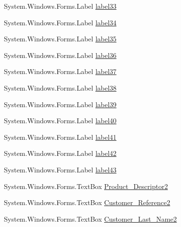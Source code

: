 \begin{DoxyCompactItemize}
\item 
System.\+Windows.\+Forms.\+Label \mbox{\hyperlink{class_cert_complete_1_1_test___creation___form_a7800633a4130b258f169fe7e93ec4bdb}{label33}}
\item 
System.\+Windows.\+Forms.\+Label \mbox{\hyperlink{class_cert_complete_1_1_test___creation___form_a40d4c70b3f1bcb0edff593cf84428ccf}{label34}}
\item 
System.\+Windows.\+Forms.\+Label \mbox{\hyperlink{class_cert_complete_1_1_test___creation___form_a8e039eaadc55719485b3562382d0e7e3}{label35}}
\item 
System.\+Windows.\+Forms.\+Label \mbox{\hyperlink{class_cert_complete_1_1_test___creation___form_a3d897c22ad731b6891fa4e32ab077075}{label36}}
\item 
System.\+Windows.\+Forms.\+Label \mbox{\hyperlink{class_cert_complete_1_1_test___creation___form_abfde8fb871d8203a5ef1a2da16982225}{label37}}
\item 
System.\+Windows.\+Forms.\+Label \mbox{\hyperlink{class_cert_complete_1_1_test___creation___form_a1dc3c664c9b980148257b88bfb493e3c}{label38}}
\item 
System.\+Windows.\+Forms.\+Label \mbox{\hyperlink{class_cert_complete_1_1_test___creation___form_a7ce53d3812e179499d43eb2b0ccf2ad9}{label39}}
\item 
System.\+Windows.\+Forms.\+Label \mbox{\hyperlink{class_cert_complete_1_1_test___creation___form_ae0b735b64fbe8ad61df99e357a1fadc5}{label40}}
\item 
System.\+Windows.\+Forms.\+Label \mbox{\hyperlink{class_cert_complete_1_1_test___creation___form_a460e7c4bc096df2bdaa62c4e5568fbd7}{label41}}
\item 
System.\+Windows.\+Forms.\+Label \mbox{\hyperlink{class_cert_complete_1_1_test___creation___form_a156824bdbc14253347151dadd163dd88}{label42}}
\item 
System.\+Windows.\+Forms.\+Label \mbox{\hyperlink{class_cert_complete_1_1_test___creation___form_a174cd8f3a68dff60c5155dfe37277fe1}{label43}}
\item 
System.\+Windows.\+Forms.\+Text\+Box \mbox{\hyperlink{class_cert_complete_1_1_test___creation___form_a5165d444955947906d5c6552f9df7bae}{Product\+\_\+\+Descriptor2}}
\item 
System.\+Windows.\+Forms.\+Text\+Box \mbox{\hyperlink{class_cert_complete_1_1_test___creation___form_add705c5a568196fb5ff776870a103489}{Customer\+\_\+\+Reference2}}
\item 
System.\+Windows.\+Forms.\+Text\+Box \mbox{\hyperlink{class_cert_complete_1_1_test___creation___form_a1b9d02f49cb348bc68044390342ea2bf}{Customer\+\_\+\+Last\+\_\+\+Name2}}

\end{DoxyCompactItemize}

